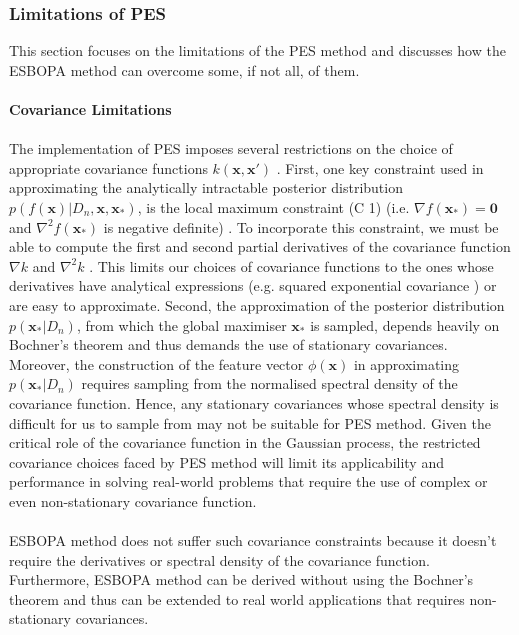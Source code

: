 \documentclass[a4paper,11pt]{report}
\begin{document}
\subsubsection{Limitations of PES} \label{LimitationsofPES}
This section focuses on the limitations of the PES method and discusses how the ESBOPA method can overcome some, if not all, of them.
\\\\
\textbf{Covariance Limitations} \label{covariancelimitations}
\\\\
The implementation of PES imposes several restrictions on the choice of appropriate covariance functions $k(\mathbf{x}, \mathbf{x}')$ \cite{requeimaintegrated}. First, one key constraint used in approximating the analytically intractable posterior distribution $p(f(\mathbf{x}) \vert D_n, \mathbf{x}, \mathbf{x}_{*})$, is the local maximum constraint (C 1) (i.e. $ \nabla f(\mathbf{x}_{*}) = \mathbf{0} $ and $ \nabla^2 f(\mathbf{x}_{*}) $ is negative definite) \cite{hernandez2014predictive}. To incorporate this constraint, we must be able to compute the first and second partial derivatives of the covariance function  $ \nabla k$ and $ \nabla^2 k$ \cite{bitbucket code}. This limits our choices of covariance functions to the ones whose derivatives have analytical expressions (e.g. squared exponential covariance ) or are easy to approximate. Second, the approximation of the posterior distribution $p(\mathbf{x}_* \vert D_n) $, from which the global maximiser $\mathbf{x}_*$ is sampled, depends heavily on Bochner's theorem and thus demands the use of stationary covariances. Moreover, the construction of the feature vector $\phi(\mathbf{x})$ in approximating $p(\mathbf{x}_* \vert D_n) $ requires sampling from the normalised spectral density of the covariance function. Hence, any stationary covariances whose spectral density is difficult for us to sample from may not be suitable for PES method. Given the critical role of the covariance function in the Gaussian process, the restricted covariance choices faced by PES method will limit its applicability and performance in solving real-world problems that require the use of complex or even non-stationary covariance function. 
\\\\ \noindent
ESBOPA method does not suffer such covariance constraints because it doesn't require the derivatives or spectral density of the covariance function. Furthermore, ESBOPA method can be derived without using the Bochner's theorem and thus  can be extended to real world applications that requires non-stationary covariances. 
\end{document}
